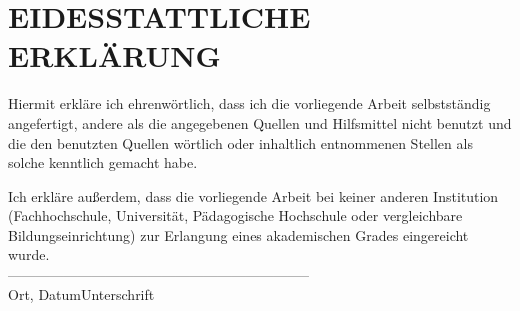 \newpage
\section*{EIDESSTATTLICHE ERKLÄRUNG}
\vspace{6cm}
Hiermit erkläre ich ehrenwörtlich, dass ich die vorliegende Arbeit selbstständig angefertigt, andere als die angegebenen Quellen und Hilfsmittel nicht benutzt und die den benutzten Quellen wörtlich oder inhaltlich entnommenen Stellen als solche kenntlich gemacht habe.

Ich erkläre außerdem, dass die vorliegende Arbeit bei keiner anderen Institution (Fachhochschule, Universität, Pädagogische Hochschule oder vergleichbare Bildungseinrichtung) zur Erlangung eines akademischen Grades eingereicht wurde.
\vspace{3cm}
\\
---------------------------------------\hspace*{4cm}--------------------------
\\\hspace*{1.5cm}Ort, Datum\hspace*{6.15cm}Unterschrift
